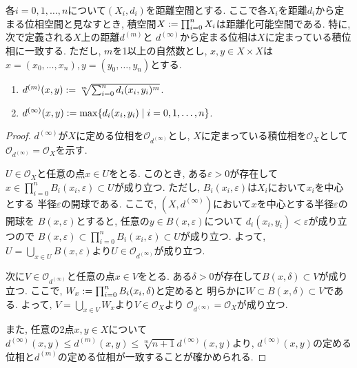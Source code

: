 \documentclass[uplatex, dvipdfmx, a4paper, 12pt, class=jsbook, crop=false]{standalone}
\begin{document}
\begin{proposition}
	各$ i = 0, 1, \ldots, n $について$ (X_i, d_i) $を距離空間とする.
	ここで各$ X_i $を距離$ d_i $から定まる位相空間と見なすとき,
	積空間$ X \mathrel{:=} \prod_{i=0}^n X_i $は距離化可能空間である.
	特に, 次で定義される$ X $上の距離$ d^{(m)} $と
	$ d^{(\infty)} $から定まる位相は$ X $に定まっている積位相に一致する.
	ただし, $ m $を1以上の自然数とし, $ x, y \in X \times X $は$ x = (x_0, \ldots, x_n),
	y = (y_0, \ldots, y_n) $とする.
	\begin{enumerate}
		\item $ d^{(m)}(x, y) \mathrel{:=} \sqrt[m]{\sum_{i=0}^n d_i(x_i, y_i)^m} $.
		\item $ d^{(\infty)}(x, y) \defeq \max \setcomp{d_i(x_i, y_i)}{i=0, 1, \ldots, n} $.
	\end{enumerate}
\end{proposition}

\begin{proof}
	$ d^{(\infty)} $が$ X $に定める位相を$ \mathcal{O}_{d^{(\infty)}} $とし,
	$ X $に定まっている積位相を$ \mathcal{O}_X $として
	$ \mathcal{O}_{d^{(\infty)}} = \mathcal{O}_X $を示す.

	$ U \in \mathcal{O}_X $と任意の点$ x \in U $をとる.
	このとき, ある$ \varepsilon > 0 $が存在して
	$ x \in \prod_{i=0}^n B_i(x_i, \varepsilon) \subset U $が成り立つ.
	ただし, $ B_i(x_i, \varepsilon) $は$ X_i $において$ x_i $を中心とする
	半径$ \varepsilon $の開球である.
	ここで, $ (X, d^{(\infty)}) $において$ x $を中心とする半径$ \varepsilon $の開球を
	$ B(x, \varepsilon) $とすると, 任意の$ y \in B(x, \varepsilon) $について
	$ d_i(x_i, y_i) < \varepsilon $が成り立つので
	$ B(x, \varepsilon) \subset \prod_{i=0}^n B_i(x_i, \varepsilon) \subset U $が成り立つ.
	よって, $ U = \bigcup_{x \in U} B(x, \varepsilon) $より$ U \in \mathcal{O}_{d^{(\infty)}} $が成り立つ.

	次に$ V \in \mathcal{O}_{d^{(\infty)}} $と任意の点$ x \in V $をとる.
	ある$ \delta > 0 $が存在して$ B(x, \delta) \subset V $が成り立つ.
	ここで, $ W_x \mathrel{:=} \prod_{i=0}^n B_i(x_i, \delta) $と定めると
	明らかに$ W \subset B(x, \delta) \subset V $である.
	よって, $ V = \bigcup_{x \in V} W_x $より$ V \in \mathcal{O}_X $より
	$ \mathcal{O}_{d^{(\infty)}} = \mathcal{O}_X $が成り立つ.

	また, 任意の2点$ x, y \in X $について$ d^{(\infty)}(x, y) \leq
	d^{(m)}(x, y) \leq \sqrt[m]{n+1} d^{(\infty)}(x, y)$より,
	$ d^{(\infty)}(x, y) $の定める位相と$ d^{(m)} $の定める位相が一致することが確かめられる.
\end{proof}
\end{document}
